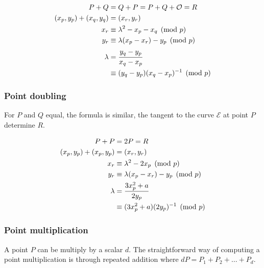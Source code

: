 \begin{equation}
\begin{split}
  P + Q &= Q + P = P + Q + \mathcal{O} = R \\
  (x_p, y_p) + (x_q, y_q) &= (x_r, y_r) \\
  x_r &\equiv \lambda^2 - x_p - x_q \pmod p \\
  y_r &\equiv \lambda(x_p - x_r) - y_p \pmod p  \\
  \lambda &= \cfrac{y_q - y_p}{x_q - x_p} \\
          &\equiv (y_q - y_p)(x_q - x_p)^{-1} \pmod p
\end{split}
\end{equation}

\subsubsection{Point doubling}

For $P$ and $Q$ equal, the formula is similar, the tangent to the curve
$\mathcal{E}$ at point $P$ determine $R$.

\begin{equation}
\begin{split}
  P + P &= 2P = R \\
  (x_p, y_p) + (x_p, y_p) &= (x_r, y_r) \\
  x_r &\equiv \lambda^2 - 2x_p \pmod p \\
  y_r &\equiv \lambda(x_p - x_r) - y_p \pmod p  \\
  \lambda &= \cfrac{3x_p^2 + a}{2y_p} \\
          &\equiv (3x_p^2 + a)(2y_p)^{-1} \pmod p
\end{split}
\end{equation}

\subsubsection{Point multiplication}

A point $P$ can be multiply by a scalar $d$. The straightforward way of
computing a point multiplication is through repeated addition where $dP = P_1 +
P_2 + \dots + P_d$.



